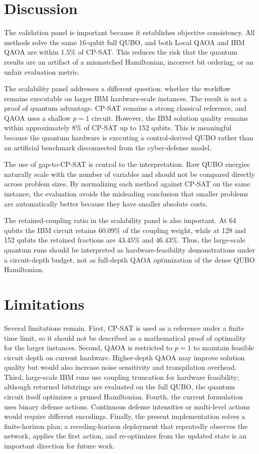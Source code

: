 \documentclass[runningheads]{llncs}
\begin{document}
\section{Discussion}

The validation panel is important because it establishes objective consistency. All methods solve the same 16-qubit full QUBO, and both Local QAOA and IBM QAOA are within $1.5\%$ of CP-SAT. This reduces the risk that the quantum results are an artifact of a mismatched Hamiltonian, incorrect bit ordering, or an unfair evaluation metric.

The scalability panel addresses a different question: whether the workflow remains executable on larger IBM hardware-scale instances. The result is not a proof of quantum advantage. CP-SAT remains a strong classical reference, and QAOA uses a shallow $p=1$ circuit. However, the IBM solution quality remains within approximately $8\%$ of CP-SAT up to 152 qubits. This is meaningful because the quantum hardware is executing a control-derived QUBO rather than an artificial benchmark disconnected from the cyber-defense model.

The use of gap-to-CP-SAT is central to the interpretation. Raw QUBO energies naturally scale with the number of variables and should not be compared directly across problem sizes. By normalizing each method against CP-SAT on the same instance, the evaluation avoids the misleading conclusion that smaller problems are automatically better because they have smaller absolute costs.

The retained-coupling ratio in the scalability panel is also important. At 64 qubits the IBM circuit retains $60.09\%$ of the coupling weight, while at 128 and 152 qubits the retained fractions are $43.45\%$ and $46.43\%$. Thus, the large-scale quantum runs should be interpreted as hardware-feasibility demonstrations under a circuit-depth budget, not as full-depth QAOA optimization of the dense QUBO Hamiltonian.

\section{Limitations}

Several limitations remain. First, CP-SAT is used as a reference under a finite time limit, so it should not be described as a mathematical proof of optimality for the larger instances. Second, QAOA is restricted to $p=1$ to maintain feasible circuit depth on current hardware. Higher-depth QAOA may improve solution quality but would also increase noise sensitivity and transpilation overhead. Third, large-scale IBM runs use coupling truncation for hardware feasibility; although returned bitstrings are evaluated on the full QUBO, the quantum circuit itself optimizes a pruned Hamiltonian. Fourth, the current formulation uses binary defense actions. Continuous defense intensities or multi-level actions would require different encodings. Finally, the present implementation solves a finite-horizon plan; a receding-horizon deployment that repeatedly observes the network, applies the first action, and re-optimizes from the updated state is an important direction for future work.
\end{document}
